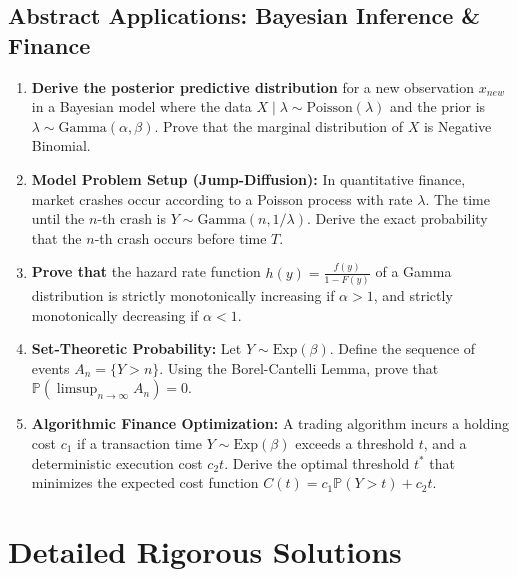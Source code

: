 \documentclass[11pt, a4paper]{article}
\theoremstyle{definition}
\theoremstyle{remark}
\newcommand{\Prob}{\mathbb{P}}
\begin{document}
\subsection{Abstract Applications: Bayesian Inference \& Finance}
\begin{enumerate}[label=\textbf{\arabic*.}, resume]
    \item \textbf{Derive the posterior predictive distribution} for a new observation $x_{new}$ in a Bayesian model where the data $X \mid \lambda \sim \text{Poisson}(\lambda)$ and the prior is $\lambda \sim \text{Gamma}(\alpha, \beta)$. Prove that the marginal distribution of $X$ is Negative Binomial.
    \item \textbf{Model Problem Setup (Jump-Diffusion):} In quantitative finance, market crashes occur according to a Poisson process with rate $\lambda$. The time until the $n$-th crash is $Y \sim \text{Gamma}(n, 1/\lambda)$. Derive the exact probability that the $n$-th crash occurs before time $T$.
    \item \textbf{Prove that} the hazard rate function $h(y) = \frac{f(y)}{1 - F(y)}$ of a Gamma distribution is strictly monotonically increasing if $\alpha > 1$, and strictly monotonically decreasing if $\alpha < 1$.
    \item \textbf{Set-Theoretic Probability:} Let $Y \sim \text{Exp}(\beta)$. Define the sequence of events $A_n = \{Y > n\}$. Using the Borel-Cantelli Lemma, prove that $\Prob(\limsup_{n \to \infty} A_n) = 0$.
    \item \textbf{Algorithmic Finance Optimization:} A trading algorithm incurs a holding cost $c_1$ if a transaction time $Y \sim \text{Exp}(\beta)$ exceeds a threshold $t$, and a deterministic execution cost $c_2 t$. Derive the optimal threshold $t^*$ that minimizes the expected cost function $C(t) = c_1 \Prob(Y > t) + c_2 t$.
\end{enumerate}

\newpage

\section{Detailed Rigorous Solutions}
\end{document}
